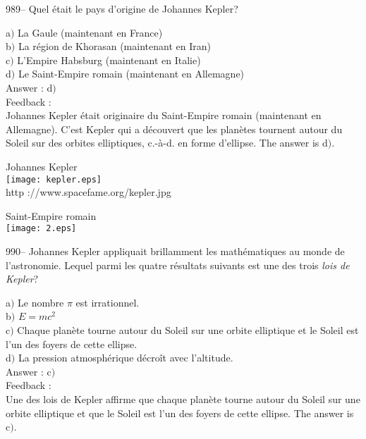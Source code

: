\documentclass[letterpaper, 12pt]{article}
\begin{document}
989-- Quel \'etait le pays d'origine de Johannes Kepler?

a$)$ La Gaule (maintenant en France) \\
b$)$ La r\'egion de Khorasan (maintenant en Iran) \\
c$)$ L'Empire Habsburg (maintenant en Italie) \\
d$)$ Le Saint-Empire romain (maintenant en Allemagne)\\

Answer : d$)$\\

Feedback : \\
Johannes Kepler \'etait originaire du Saint-Empire romain
(maintenant en Allemagne). C'est Kepler qui a d\'ecouvert que les
plan\`etes tournent autour du Soleil sur des orbites elliptiques,
c.-\`a-d. en forme d'ellipse.
The answer is d$)$.\\

        \begin{center}
        Johannes Kepler\\
    \texttt{[image: kepler.eps]}\\
        {\footnotesize http ://www.spacefame.org/kepler.jpg}
    \end{center}

        \begin{center}
        Saint-Empire romain\\
    \texttt{[image: 2.eps]}\\
    \end{center}

990-- Johannes Kepler appliquait brillamment les math\'ematiques au
monde de l'astronomie. Lequel parmi les quatre r\'esultats suivants
est une des trois {\sl lois de Kepler}?

a$)$ Le nombre $\pi$ est irrationnel.\\
b$)$ $E=mc^2$ \\
c$)$ Chaque plan\`ete tourne autour du Soleil sur une orbite
elliptique et le Soleil
est l'un des foyers de cette ellipse. \\
d$)$ La pression atmosph\'erique d\'ecro\^it avec l'altitude.\\

Answer : c$)$\\

Feedback : \\
Une des lois de Kepler affirme que chaque plan\`ete tourne autour du
Soleil sur une orbite elliptique et que le Soleil
est l'un des foyers de cette ellipse. The answer is c$)$.\\
\end{document}
